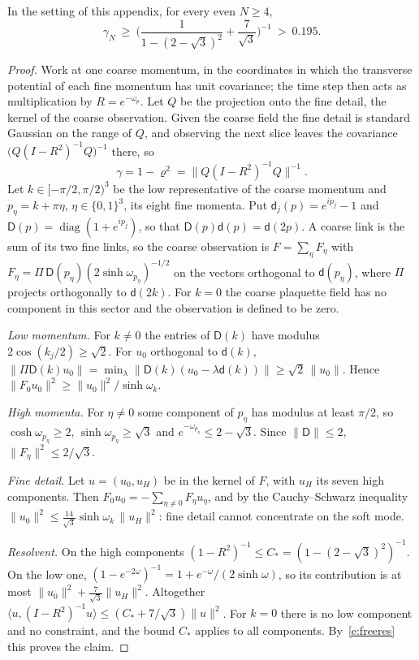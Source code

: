 \begin{proposition}\label{p:freemix}
In the setting of this appendix, for every even $N\ge4$,
\[
\gamma_N\ \ge\ \Big(\frac1{1-(2-\sqrt3)^2}+\frac7{\sqrt3}\Big)^{-1}\ >\ 0.195 .
\]
\end{proposition}
\begin{proof}
Work at one coarse momentum, in the coordinates in which the transverse potential of each fine momentum has
unit covariance; the time step then acts as multiplication by $R=e^{-\omega_p}$. Let $Q$ be the projection
onto the fine detail, the kernel of the coarse observation. Given the coarse field the fine detail is
standard Gaussian on the range of $Q$, and observing the next slice leaves the covariance
$\big(Q(I-R^2)^{-1}Q\big)^{-1}$ there, so
\begin{equation}\label{e:freeres}
\gamma=1-\varrho^2=\big\|Q(I-R^2)^{-1}Q\big\|^{-1}.
\end{equation}
Let $k\in[-\pi/2,\pi/2)^3$ be the low representative of the coarse momentum and $p_\eta=k+\pi\eta$,
$\eta\in\{0,1\}^3$, its eight fine momenta. Put $\mathsf d_j(p)=e^{ip_j}-1$ and
$\mathsf D(p)=\operatorname{diag}(1+e^{ip_j})$, so that $\mathsf D(p)\mathsf d(p)=\mathsf d(2p)$. A coarse
link is the sum of its two fine links, so the coarse observation is $F=\sum_\eta F_\eta$ with
$F_\eta=\Pi\,\mathsf D(p_\eta)(2\sinh\omega_{p_\eta})^{-1/2}$ on the vectors orthogonal to $\mathsf d(p_\eta)$,
where $\Pi$ projects orthogonally to $\mathsf d(2k)$. For $k=0$ the coarse plaquette field has no component
in this sector and the observation is defined to be zero.

\emph{Low momentum.} For $k\ne0$ the entries of $\mathsf D(k)$ have modulus $2\cos(k_j/2)\ge\sqrt2$. For $u_0$
orthogonal to $\mathsf d(k)$, $\|\Pi\mathsf D(k)u_0\|=\min_\lambda\|\mathsf D(k)(u_0-\lambda\mathsf d(k))\|
\ge\sqrt2\,\|u_0\|$. Hence $\|F_0u_0\|^2\ge\|u_0\|^2/\sinh\omega_k$.

\emph{High momenta.} For $\eta\ne0$ some component of $p_\eta$ has modulus at least $\pi/2$, so
$\cosh\omega_{p_\eta}\ge2$, $\sinh\omega_{p_\eta}\ge\sqrt3$ and $e^{-\omega_{p_\eta}}\le2-\sqrt3$. Since
$\|\mathsf D\|\le2$, $\|F_\eta\|^2\le2/\sqrt3$.

\emph{Fine detail.} Let $u=(u_0,u_H)$ be in the kernel of $F$, with $u_H$ its seven high components. Then
$F_0u_0=-\sum_{\eta\ne0}F_\eta u_\eta$, and by the Cauchy--Schwarz inequality
$\|u_0\|^2\le\tfrac{14}{\sqrt3}\sinh\omega_k\,\|u_H\|^2$: fine detail cannot concentrate on the soft mode.

\emph{Resolvent.} On the high components $(1-R^2)^{-1}\le C_*=(1-(2-\sqrt3)^2)^{-1}$. On the low one,
$(1-e^{-2\omega})^{-1}=1+e^{-\omega}/(2\sinh\omega)$, so its contribution is at most
$\|u_0\|^2+\tfrac{7}{\sqrt3}\|u_H\|^2$. Altogether
$\langle u,(I-R^2)^{-1}u\rangle\le(C_*+7/\sqrt3)\|u\|^2$. For $k=0$ there is no low component and no constraint, and the bound $C_*$ applies to all components. By~\eqref{e:freeres} this proves the claim.
\end{proof}

